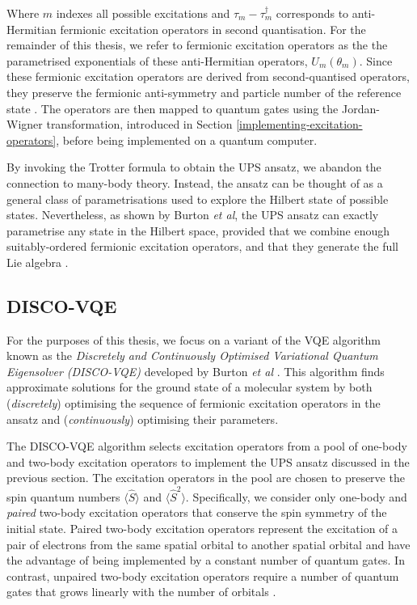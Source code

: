 Where $m$ indexes all possible excitations and $\tau_m - \tau_m^\dagger$ corresponds to anti-Hermitian fermionic excitation operators in second quantisation. For the remainder of this thesis, we refer to fermionic excitation operators as the the parametrised exponentials of these anti-Hermitian operators, $U_m(\theta_m)$. Since these fermionic excitation operators are derived from second-quantised operators, they preserve the fermionic anti-symmetry and particle number of the reference state \cite{Burton2023}. The operators are then mapped to quantum gates using the Jordan-Wigner transformation, introduced in Section \ref{implementing-excitation-operators}, before being implemented on a quantum computer.

By invoking the Trotter formula to obtain the UPS ansatz, we abandon the connection to many-body theory. Instead, the ansatz can be thought of as a general class of parametrisations used to explore the Hilbert state of possible states. Nevertheless, as shown by Burton \textit{et al}, the UPS ansatz can exactly parametrise any state in the Hilbert space, provided that we combine enough suitably-ordered fermionic excitation operators, and that they generate the full Lie algebra \cite{Burton2023}.


\subsection{DISCO-VQE}%
\label{disco-vqe}

For the purposes of this thesis, we focus on a variant of the VQE algorithm known as the \textit{Discretely and Continuously Optimised Variational Quantum Eigensolver (DISCO-VQE)} developed by Burton \textit{et al} \cite{Burton2023}. This algorithm finds approximate solutions for the ground state of a molecular system by both (\textit{discretely}) optimising the sequence of fermionic excitation operators in the ansatz and (\textit{continuously}) optimising their parameters.

The DISCO-VQE algorithm selects excitation operators from a pool of one-body and two-body excitation operators to implement the UPS ansatz discussed in the previous section. The excitation operators in the pool are chosen to preserve the spin quantum numbers $\langle \hat S \rangle$ and $\langle \hat S^2 \rangle$. Specifically, we consider only one-body and \textit{paired} two-body excitation operators that conserve the spin symmetry of the initial state. Paired two-body excitation operators represent the excitation of a pair of electrons from the same spatial orbital to another spatial orbital and have the advantage of being implemented by a constant number of quantum gates. In contrast, unpaired two-body excitation operators require a number of quantum gates that grows linearly with the number of orbitals \cite{Burton2023}.

